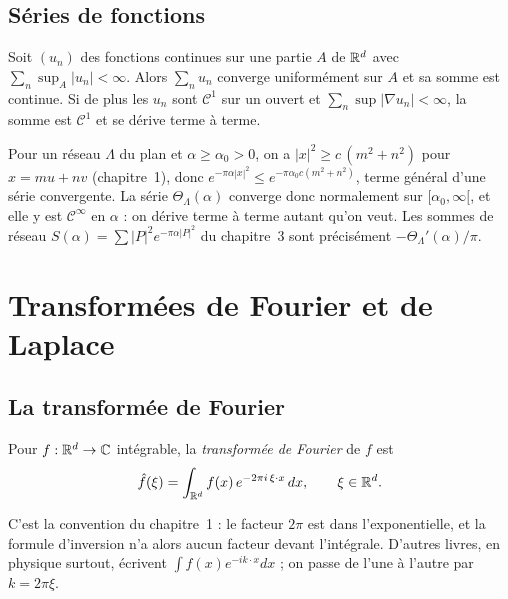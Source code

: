 \subsection{Séries de fonctions}

\begin{proposition}\label{appA:prop:normale}
Soit $(u_n)$ des fonctions continues sur une partie $A$ de $\mathbb{R}^d$ avec $\sum_n\sup_A|u_n|<\infty$. Alors
$\sum_nu_n$ converge uniformément sur $A$ et sa somme est continue. Si de plus les $u_n$ sont $\mathcal C^1$ sur un
ouvert et $\sum_n\sup|\nabla u_n|<\infty$, la somme est $\mathcal C^1$ et se dérive terme à terme.
\end{proposition}

\begin{example}
Pour un réseau $\Lambda$ du plan et $\alpha\ge\alpha_0>0$, on a $|x|^2\ge c\,(m^2+n^2)$ pour $x=mu+nv$ (chapitre~1),
donc $e^{-\pi\alpha|x|^2}\le e^{-\pi\alpha_0c(m^2+n^2)}$, terme général d'une série convergente. La série
$\Theta_\Lambda(\alpha)$ converge donc normalement sur $[\alpha_0,\infty[$, et elle y est $\mathcal C^\infty$ en
$\alpha$ : on dérive terme à terme autant qu'on veut. Les sommes de réseau $S(\alpha)=\sum|P|^2e^{-\pi\alpha|P|^2}$ du
chapitre~3 sont précisément $-\Theta_\Lambda'(\alpha)/\pi$.
\end{example}

\section{Transformées de Fourier et de Laplace}\label{appA:sec:fourier}

\subsection{La transformée de Fourier}

\begin{definition}
Pour $f:\mathbb{R}^d\to\mathbb{C}$ intégrable, la \emph{transformée de Fourier} de $f$ est
\[\hat f(\xi)=\int_{\mathbb{R}^d}f(x)\,e^{-2\pi i\,\xi\cdot x}\,dx,\qquad\xi\in\mathbb{R}^d .\]
\end{definition}
C'est la convention du chapitre~1 : le facteur $2\pi$ est dans l'exponentielle, et la formule d'inversion n'a alors
aucun facteur devant l'intégrale. D'autres livres, en physique surtout, écrivent $\int f(x)e^{-ik\cdot x}dx$ ; on passe
de l'une à l'autre par $k=2\pi\xi$.

